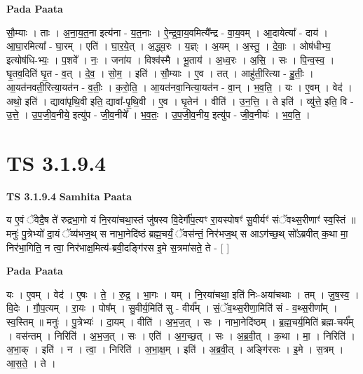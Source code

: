 \documentclass[17pt]{extarticle}
\begin{document}
\textbf{Pada Paata} \newline

सौ॒म्याः । ताः । अ॒ना॒य॒त॒ना इत्य॑ना - य॒त॒नाः । ऐ॒न्द्र॒वा॒य॒वमित्यै᳚न्द्र - वा॒य॒वम् । आ॒दायेत्या᳚ - दाय॑ । आ॒घा॒रमित्या᳚ - घा॒रम् । एति॑ । घा॒र॒ये॒त् । अ॒द्ध्व॒रः । य॒ज्ञ्ः । अ॒यम् । अ॒स्तु॒ । दे॒वाः॒ । ओष॑धीभ्य॒ इत्योष॑धि-भ्यः॒ । प॒शवे᳚ । नः॒ । जना॑य । विश्व॑स्मै । भू॒ताय॑ । अ॒ध्व॒रः । अ॒सि॒ । सः । पि॒न्व॒स्व॒ । घृ॒तव॒दिति॑ घृ॒त - व॒त् । दे॒व॒ । सो॒म॒ । इति॑ । सौ॒म्याः । ए॒व । तत् । आहु॑ती॒रित्या - हु॒तीः॒ । आ॒यत॑नवती॒रित्या॒यत॑न - व॒तीः॒ । क॒रो॒ति॒ । आ॒यत॑नवा॒नित्या॒यत॑न - वा॒न् । भ॒व॒ति॒ । यः । ए॒वम् । वेद॑ । अथो॒ इति॑ । द्यावा॑पृथि॒वी इति॒ द्यावा᳚-पृ॒थि॒वी । ए॒व । घृ॒तेन॑ । वीति॑ । उ॒न॒त्ति॒ । ते इति॑ । व्यु॑त्ते॒ इति॒ वि - उ॒त्ते॒ । उ॒प॒जी॒व॒नीये॒ इत्यु॑प - जी॒व॒नीये᳚ । भ॒व॒तः॒ । उ॒प॒जी॒व॒नीय॒ इत्यु॑प - जी॒व॒नीयः॑ । भ॒व॒ति॒ ।  \newline





\section{ TS 3.1.9.4 }

\textbf{TS 3.1.9.4 } \newline
\textbf{Samhita Paata} \newline

य ए॒वं ॅवेदै॒ष ते॑ रुद्रभा॒गो यं नि॒रया॑चथा॒स्तं जु॑षस्व वि॒देर्गौ॑प॒त्यꣳ रा॒यस्पोषꣳ॑ सु॒वीर्यꣳ॑ संॅवथ्स॒रीणाꣳ॑ स्व॒स्तिं ॥ मनुः॑ पु॒त्रेभ्यो॑ दा॒यं ॅव्य॑भज॒थ् स नाभा॒नेदि॑ष्ठं ब्रह्म॒चर्यं॒ ॅवस॑न्तं॒ निर॑भज॒थ् स आऽग॑च्छ॒थ् सो᳚ऽब्रवीत् क॒था मा॒ निर॑भा॒गिति॒ न त्वा॒ निर॑भाक्ष॒मित्य॑-ब्रवी॒दङ्गि॑रस इ॒मे स॒त्रमा॑सते॒ ते - [  ] \newline

\textbf{Pada Paata} \newline

यः । ए॒वम् । वेद॑ । ए॒षः । ते॒ । रु॒द्र॒ । भा॒गः । यम् । नि॒रया॑चथा॒ इति॑ निः-अया॑चथाः । तम् । जु॒ष॒स्व॒ । वि॒देः । गौ॒प॒त्यम् । रा॒यः । पोष᳚म् । सु॒वीर्य॒मिति॑ सु - वीर्य᳚म् । सं॒ॅव॒थ्स॒रीणा॒मिति॑ सं - व॒थ्स॒रीणा᳚म् । स्व॒स्तिम् ॥ मनुः॑ । पु॒त्रेभ्यः॑ । दा॒यम् । वीति॑ । अ॒भ॒ज॒त् । सः । नाभा॒नेदि॑ष्ठम् । ब्र॒ह्म॒चर्य॒मिति॑ ब्रह्म-चर्य᳚म् । वस॑न्तम् । निरिति॑ । अ॒भ॒ज॒त् । सः । एति॑ । अ॒ग॒च्छ॒त् । सः । अ॒ब्र॒वी॒त् । क॒था । मा॒ । निरिति॑ । अ॒भा॒क् । इति॑ । न । त्वा॒ । निरिति॑ । अ॒भा॒क्ष॒म् । इति॑ । अ॒ब्र॒वी॒त् । अङ्गि॑रसः । इ॒मे । स॒त्रम् । आ॒स॒ते॒ । ते ।  \newline
\end{document}
